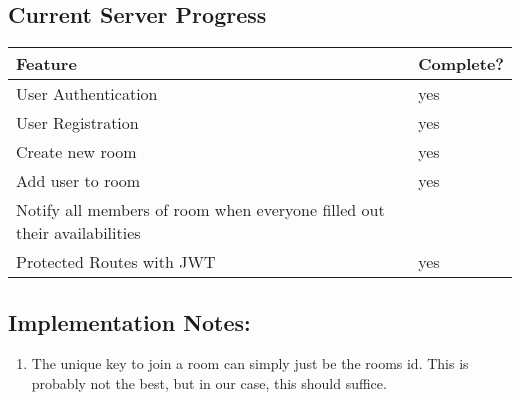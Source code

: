\documentclass[11pt]{article}
\begin{document}
\subsection{Current Server Progress}
\label{sec:orgae11473}

\begin{center}
\begin{tabular}{ll}
Feature & Complete?\\
\hline
User Authentication & yes\\
User Registration & yes\\
Create new room & yes\\
Add user to room & yes\\
Notify all members of room when everyone filled out their availabilities & \\
Protected Routes with JWT & yes\\
\end{tabular}
\end{center}


\subsection{Implementation Notes:}
\label{sec:org43b58ff}

\begin{enumerate}
\item The unique key to join a room can simply just be the rooms id. This is probably not the best, but in our case, this should suffice.
\end{enumerate}
\end{document}
